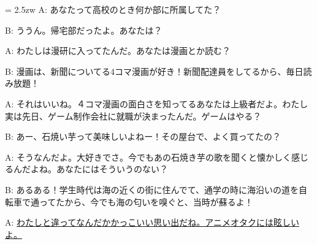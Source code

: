 \documentclass[11pt]{amsart}
\title{}
\author{}
\newenvironment{hangall}[1]{\hangindent = 2.5zw\everypar{\hangindent = 2.5zw}}{}
\begin{document}
\maketitle
\begin{hangall}{}%
A: あなたって高校のとき何か部に所属してた？

B: ううん。帰宅部だったよ。あなたは？

A: わたしは漫研に入ってたんだ。あなたは漫画とか読む？

B: 漫画は、新聞についてる4コマ漫画が好き！新聞配達員をしてるから、毎日読み放題！

A: それはいいね。４コマ漫画の面白さを知ってるあなたは上級者だよ。わたし実は先日、ゲーム制作会社に就職が決まったんだ。ゲームはやる？

B: あー、石焼い芋って美味しいよねー！その屋台で、よく買ってたの？

A: そうなんだよ。大好きでさ。今でもあの石焼き芋の歌を聞くと懐かしく感じるんだよね。あなたにはそういうのない？

B: あるある！学生時代は海の近くの街に住んでて、通学の時に海沿いの道を自転車で通ってたから、今でも海の匂いを嗅ぐと、当時が蘇るよ！

A: \ul{わたしと違ってなんだかかっこいい思い出だね。アニメオタクには眩しいよ。}\end{hangall}
\end{document}
